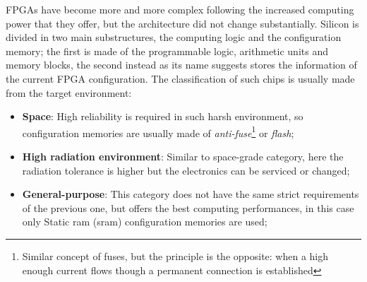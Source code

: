 \documentclass[../../main.tex]{subfiles}
\begin{document}
FPGAs have become more and more complex following the increased computing power that they offer, but the architecture did not change substantially. Silicon is divided in two main substructures, the computing logic and the configuration memory; the first is made of the programmable logic, arithmetic units and memory blocks, the second instead as its name suggests stores the information of the current FPGA configuration. The classification of such chips is usually made from the target environment:
\begin{itemize}
    \item \textbf{Space}: High reliability is required in such harsh environment, so configuration memories are usually made of \textit{anti-fuse}\footnote{Similar concept of fuses, but the principle is the opposite: when a high enough current flows though a permanent connection is established} or \textit{flash};
    \item \textbf{High radiation environment}: Similar to space-grade category, here the radiation tolerance is higher but the electronics can be serviced or changed;
    \item \textbf{General-purpose}: This category does not have the same strict requirements of the previous one, but offers the best computing performances, in this case only Static \acrshort{ram} (\acrshort{sram}) configuration memories are used;
\end{itemize}
        
\end{document}
